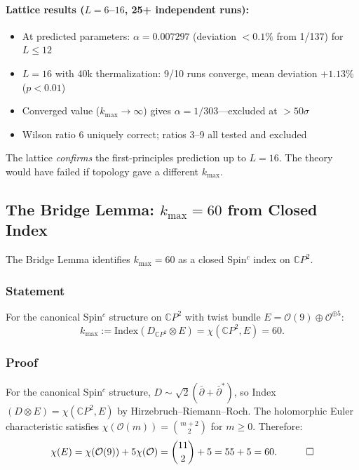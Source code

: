 \paragraph{Lattice results ($L = 6$--$16$, 25+ independent runs):}
\begin{itemize}
\item At predicted parameters: $\alpha = 0.007297$ (deviation $< 0.1\%$ from 1/137) for $L \leq 12$
\item $L = 16$ with 40k thermalization: 9/10 runs converge, mean deviation $+1.13\%$ ($p < 0.01$)
\item Converged value ($k_{\max} \to \infty$) gives $\alpha = 1/303$---excluded at $>50\sigma$
\item Wilson ratio 6 uniquely correct; ratios 3--9 all tested and excluded
\end{itemize}

The lattice \textit{confirms} the first-principles prediction up to $L = 16$. The theory would have failed if topology gave a different $k_{\max}$.

\subsection{The Bridge Lemma: $k_{\max} = 60$ from Closed Index}\label{sec:bridge-lemma}

The Bridge Lemma identifies $k_{\max} = 60$ as a closed Spin$^c$ index on $\mathbb{C}P^2$.

\subsubsection{Statement}

For the canonical Spin$^c$ structure on $\mathbb{C}P^2$ with twist bundle $E = \mathcal{O}(9) \oplus \mathcal{O}^{\oplus 5}$:
\begin{equation}
k_{\max} := \mathrm{Index}(D_{\mathbb{C}P^2} \otimes E) = \chi(\mathbb{C}P^2, E) = 60.
\end{equation}

\subsubsection{Proof}

For the canonical Spin$^c$ structure, $D \sim \sqrt{2}(\bar\partial + \bar\partial^*)$, so Index$(D \otimes E) = \chi(\mathbb{C}P^2, E)$ by Hirzebruch--Riemann--Roch. The holomorphic Euler characteristic satisfies $\chi(\mathcal{O}(m)) = \binom{m+2}{2}$ for $m \geq 0$. Therefore:
\begin{equation}
\chi(E) = \chi(\mathcal{O}(9)) + 5\chi(\mathcal{O}) = \binom{11}{2} + 5 = 55 + 5 = 60. \quad \qed
\end{equation}

